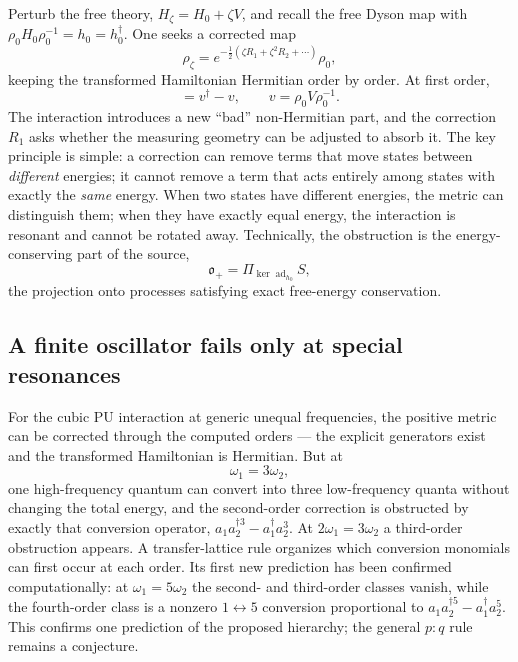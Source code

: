 \documentclass[11pt]{article}
\theoremstyle{remark}
\newcommand{\w}{\omega}
\newcommand{\dg}{\dagger}
\begin{document}
Perturb the free theory, $H_\zeta=H_0+\zeta V$, and recall the free
Dyson map with $\rho_0H_0\rho_0^{-1}=h_0=h_0^{\dg}$.  One seeks a
corrected map
\begin{equation}
\rho_\zeta=e^{-\frac12(\zeta R_1+\zeta^2R_2+\cdots)}\rho_0,
\end{equation}
keeping the transformed Hamiltonian Hermitian order by order.  At first
order,
\begin{equation}
[h_0,R_1]=v^{\dg}-v,
\qquad v=\rho_0V\rho_0^{-1}.
\end{equation}
The interaction introduces a new ``bad'' non-Hermitian part, and the
correction $R_1$ asks whether the measuring geometry can be adjusted to
absorb it.  The key principle is simple: a correction can remove terms
that move states between \emph{different} energies; it cannot remove a
term that acts entirely among states with exactly the \emph{same}
energy.  When two states have different energies, the metric can
distinguish them; when they have exactly equal energy, the interaction
is resonant and cannot be rotated away.  Technically, the obstruction is
the energy-conserving part of the source,
\begin{equation}
\mathfrak o_+=\Pi_{\ker\operatorname{ad}_{h_0}}S ,
\end{equation}
the projection onto processes satisfying exact free-energy
conservation.

\subsection{A finite oscillator fails only at special resonances}

For the cubic PU interaction at generic unequal frequencies, the
positive metric can be corrected through the computed orders --- the
explicit generators exist and the transformed Hamiltonian is Hermitian.
But at
\begin{equation}
\w_1=3\w_2,
\end{equation}
one high-frequency quantum can convert into three low-frequency quanta
without changing the total energy, and the second-order correction is
obstructed by exactly that conversion operator,
$a_1a_2^{\dg3}-a_1^{\dg}a_2^3$.  At $2\w_1=3\w_2$ a third-order
obstruction appears.  A transfer-lattice rule organizes which conversion
monomials can first occur at each order.  Its first new prediction has
been confirmed computationally: at $\w_1=5\w_2$ the second- and
third-order classes vanish, while the fourth-order class is a nonzero
$1\leftrightarrow5$ conversion proportional to
$a_1a_2^{\dg5}-a_1^{\dg}a_2^5$.  This confirms one prediction of the
proposed hierarchy; the general $p{:}q$ rule remains a conjecture.
\end{document}
